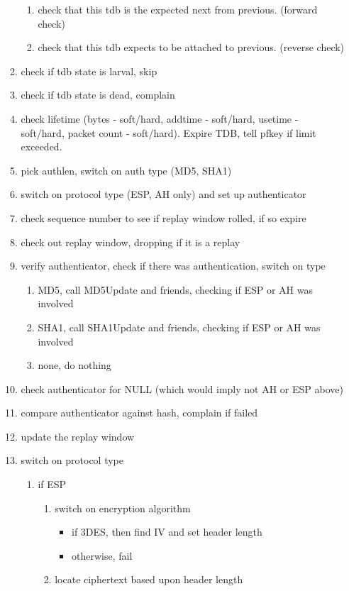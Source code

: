 \begin{enumerate}
\begin{enumerate}
\begin{enumerate}
			\item check that this tdb is the expected next from
				previous. (forward check) 	
			\item check that this tdb expects to be attached to
				previous. (reverse check) 
		\end{enumerate}
		\item check if tdb state is larval, skip
		\item check if tdb state is dead, complain
		\item check lifetime (bytes - soft/hard, addtime - soft/hard, usetime -
			soft/hard, packet count - soft/hard). Expire TDB,
			tell pfkey if limit exceeded.
		\item pick authlen, switch on auth type (MD5, SHA1)
		\item switch on protocol type (ESP, AH only) and set up authenticator
		\item check sequence number to see if replay window rolled, if so expire
		\item check out replay window, dropping if it is a replay
		\item verify authenticator, check if there was
			authentication, switch on type 
		\begin{enumerate}
			\item MD5, call MD5Update and friends, checking if
				ESP or AH was involved 
			\item SHA1, call SHA1Update and friends, checking if ESP or
				AH was involved	 
			\item none, do nothing
		\end{enumerate}
		\item check authenticator for NULL (which would imply not AH
			or ESP above) 
		\item compare authenticator against hash, complain if failed
		\item update the replay window
		\item switch on protocol type
		\begin{enumerate}
			\item if ESP
			\begin{enumerate}
				\item switch on encryption algorithm
				\begin{itemize}
					\item if 3DES, then find IV and set header length
					\item otherwise, fail
				\end{itemize}
				\item locate ciphertext based upon header length

\end{enumerate}
\end{enumerate}
\end{enumerate}
\end{enumerate}
